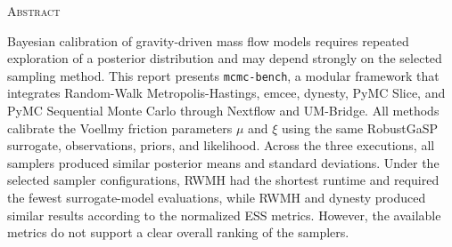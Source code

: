 \begin{center}
  \textsc{Abstract}
\end{center}
%
\noindent
%
Bayesian calibration of gravity-driven mass flow models requires repeated exploration of a posterior distribution and may depend strongly on the selected sampling method. This report presents \texttt{mcmc-bench}, a modular framework that integrates Random-Walk Metropolis-Hastings, emcee, dynesty, PyMC Slice, and PyMC Sequential Monte Carlo through Nextflow and UM-Bridge. All methods calibrate the Voellmy friction parameters $\mu$ and $\xi$ using the same RobustGaSP surrogate, observations, priors, and likelihood. Across the three executions, all samplers produced similar posterior means and standard deviations. Under the selected sampler configurations, RWMH had the shortest runtime and required the fewest surrogate-model evaluations, while RWMH and dynesty produced similar results according to the normalized ESS metrics. However, the available metrics do not support a clear overall ranking of the samplers.
